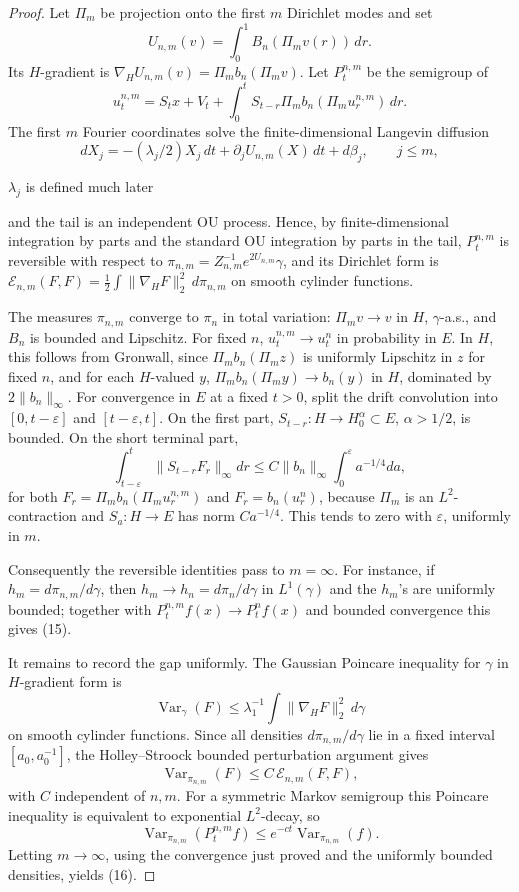 \documentclass[12pt]{article}
\newcommand{\1}{\mathbf 1}
\newcommand{\Var}{\operatorname{Var}}
\newcommand{\calE}{\mathcal E}
\newcommand{\review}[1]{\begin{reviewbox}#1\end{reviewbox}}
\begin{document}
\begin{proof}
Let \(\Pi_m\) be projection onto the first \(m\) Dirichlet modes and set
\[
        U_{n,m}(v)=\int_0^1B_n(\Pi_m v(r))\,dr .
\]
Its \(H\)-gradient is \(\nabla_HU_{n,m}(v)=\Pi_m b_n(\Pi_m v)\).  Let
\(P_t^{n,m}\) be the semigroup of
\[
u_t^{n,m}=S_t x+V_t+\int_0^tS_{t-r}\Pi_m b_n(\Pi_m u_r^{n,m})\,dr .
\]
The first \(m\) Fourier coordinates solve the finite-dimensional Langevin
diffusion
\[
dX_j=-(\lambda_j/2)X_j\,dt+\partial_j U_{n,m}(X)\,dt+d\beta_j,
\qquad j\le m,
\]
\review{$\lambda_j$ is defined much later}
and the tail is an independent OU process.  Hence, by finite-dimensional
integration by parts and the standard OU integration by parts in the tail,
\(P_t^{n,m}\) is reversible with respect to
\(\pi_{n,m}=Z_{n,m}^{-1}e^{2U_{n,m}}\gamma\), and its Dirichlet form is
\(\calE_{n,m}(F,F)=\frac12\int\|\nabla_HF\|_2^2\,d\pi_{n,m}\) on smooth
cylinder functions.

The measures \(\pi_{n,m}\) converge to \(\pi_n\) in total variation: \(\Pi_m
v\to v\) in \(H\), \(\gamma\)-a.s., and \(B_n\) is bounded and Lipschitz.  For
fixed \(n\), \(u_t^{n,m}\to u_t^n\) in probability in \(E\).  In \(H\), this
follows from Gronwall, since \(\Pi_m b_n(\Pi_m z)\) is uniformly Lipschitz in
\(z\) for fixed \(n\), and for each \(H\)-valued \(y\),
\(\Pi_m b_n(\Pi_m y)\to b_n(y)\) in \(H\), dominated by \(2\|b_n\|_\infty\).
For convergence in \(E\) at a fixed \(t>0\), split the drift convolution into
\([0,t-\varepsilon]\) and \([t-\varepsilon,t]\).  On the first part,
\(S_{t-r}:H\to H^\alpha_0\subset E\), \(\alpha>1/2\), is bounded.  On the
short terminal part,
\[
 \int_{t-\varepsilon}^t\|S_{t-r}F_r\|_\infty dr
 \le C\|b_n\|_\infty\int_0^\varepsilon a^{-1/4}da,
\]
for both \(F_r=\Pi_m b_n(\Pi_mu_r^{n,m})\) and \(F_r=b_n(u_r^n)\), because
\(\Pi_m\) is an \(L^2\)-contraction and \(S_a:H\to E\) has norm \(Ca^{-1/4}\).
This tends to zero with \(\varepsilon\), uniformly in \(m\).

Consequently the reversible identities pass to \(m=\infty\).  For instance,
if \(h_m=d\pi_{n,m}/d\gamma\), then \(h_m\to h_n=d\pi_n/d\gamma\) in
\(L^1(\gamma)\) and the \(h_m\)'s are uniformly bounded; together with
\(P_t^{n,m}f(x)\to P_t^nf(x)\) and bounded convergence this gives (15).

It remains to record the gap uniformly.  The Gaussian Poincare inequality for
\(\gamma\) in \(H\)-gradient form is
\[
        \Var_\gamma(F)\le \lambda_1^{-1}\int\|\nabla_HF\|_2^2\,d\gamma
\]
on smooth cylinder functions.  Since all densities
\(d\pi_{n,m}/d\gamma\) lie in a fixed interval \([a_0,a_0^{-1}]\), the
Holley--Stroock bounded perturbation argument gives
\[
        \Var_{\pi_{n,m}}(F)\le C\,\calE_{n,m}(F,F),
\]
with \(C\) independent of \(n,m\).  For a symmetric Markov semigroup this
Poincare inequality is equivalent to exponential \(L^2\)-decay, so
\[
 \Var_{\pi_{n,m}}(P_t^{n,m}f)\le e^{-ct}\Var_{\pi_{n,m}}(f).
\]
Letting \(m\to\infty\), using the convergence just proved and the uniformly
bounded densities, yields (16).
\end{proof}
\end{document}

